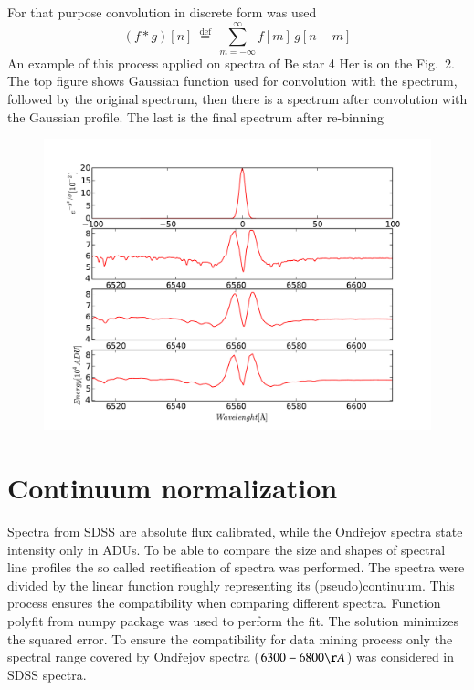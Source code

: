\documentclass[11pt,twoside]{article}
\begin{document}
For that purpose convolution in discrete form was used
%
\begin{equation}
  \label{eq:discreteConvolution}
  (f * g)[n]\ \stackrel{\mathrm{def}}{=}\ \sum_{m=-\infty}^{\infty} f[m]\, g[n - m]
\end{equation}
%
An example of this process applied on spectra of Be star 4 Her is on the
Fig.~2. The top figure shows Gaussian function used for convolution
with the spectrum, followed by the original spectrum, then there is a
spectrum after convolution with the Gaussian profile. The last is the
final spectrum after re-binning



\begin{figure}[!htbp]
\vspace{-10pt}
  \begin{center}
    \leavevmode
    \includegraphics[scale = .5]{convolution}
  \end{center}
\vspace{-10pt}
\end{figure}




\section{Continuum normalization}
Spectra from SDSS are absolute flux calibrated, while the Ond\v{r}ejov
spectra state intensity only in ADUs. To be able to compare the size
and shapes of spectral line profiles the so called rectification of
spectra was performed. The spectra were divided by the linear function
roughly representing its (pseudo)continuum. This process ensures the
compatibility when comparing different spectra. Function polyfit from
numpy package was used to perform the fit. The solution minimizes the
squared error. To ensure the compatibility for data mining process
only the spectral range covered by Ond\v{r}ejov spectra
($6300-6800\AA$) was considered in SDSS spectra.
\end{document}
